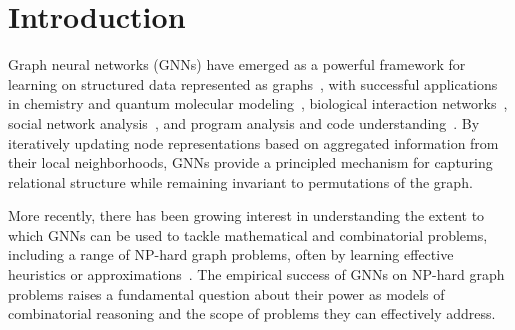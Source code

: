 \section{Introduction}
Graph neural networks (GNNs) have emerged as a powerful framework for learning on structured data represented as graphs~\citep{Bronstein2021,Battaglia2018}, with successful applications in chemistry and quantum molecular modeling~\citep{GilmerEtAl2017,Kearnes2016}, biological interaction networks~\citep{Jha2022P}, social network analysis~\citep{Kipf2016,HamiltonEtAl2017}, and program analysis and code understanding~\citep{AllamanisEtAl2018,Allamanis2022GNNProgramAnalysis}.
By iteratively updating node representations based on aggregated information from their local neighborhoods, GNNs provide a principled mechanism for capturing relational structure while remaining invariant to permutations of the graph. 

More recently, there has been growing interest in understanding the extent to which GNNs can be used to tackle mathematical and combinatorial problems, including a range of NP-hard graph problems, often by learning effective heuristics or approximations~\citep{He2025PrimalDualNA,Cappart2021CombinatorialOA,Prates2019}. The empirical success of GNNs on NP-hard graph problems raises a fundamental question about their power as models of combinatorial reasoning and the scope of problems they can effectively address.

